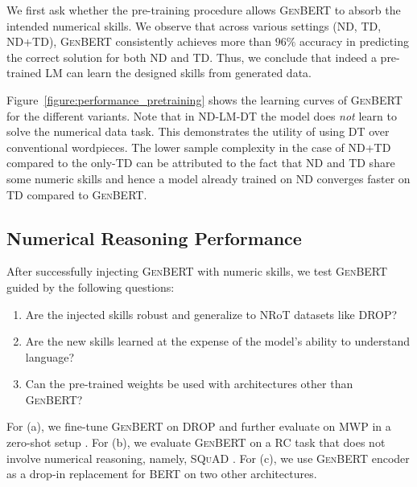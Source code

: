 \documentclass[11pt,a4paper]{article}
\newcommand\bert{\textsc{BERT}}
\newcommand\genbert{\textsc{GenBERT}}
\newcommand\drop{\textsc{DROP}}
\newcommand\squad{\textsc{SQuAD}}
\begin{document}
We first ask whether the pre-training procedure allows \genbert{} to absorb the intended numerical skills. We observe that across various settings (ND, TD, ND+TD), \genbert{} consistently achieves more than $96\%$ accuracy in predicting the correct solution for both ND and TD. Thus, we conclude that indeed a pre-trained LM can learn the designed skills from generated data.

Figure~\ref{figure:performance_pretraining} shows the learning curves of \genbert{} for the different variants. 
Note that in \textsc{ND-LM-DT} the model does \emph{not} learn to solve the numerical data task. This demonstrates the utility of using DT over conventional wordpieces. The lower sample complexity in the case of \textsc{ND+TD} compared to the only-\textsc{TD} can be attributed to the fact that ND and TD share some numeric skills and hence a model already trained on ND converges faster on TD compared to \genbert{}.















\subsection{Numerical Reasoning Performance}
\label{section:numerical_reasoning_performance}

After successfully injecting \genbert{} with numeric skills, we test \genbert{} guided by the following questions:
\begin{enumerate}[label=(\alph*),leftmargin=*,topsep=0pt,itemsep=0pt,parsep=0pt]
    \item Are the injected skills robust and generalize to NRoT datasets like \drop?
    \item Are the new skills learned at the expense of the model's ability to understand language?
\item Can the pre-trained weights be used with architectures other than \genbert{}?
\end{enumerate}
For (a), we fine-tune \genbert{} on \drop{} and further evaluate on MWP in a zero-shot setup .
For (b), we evaluate \genbert{} on a RC task that does not involve numerical reasoning, namely, \squad{} \cite{rajpurkar2016squad}. For (c), we use \genbert{} encoder as a drop-in replacement for \bert{} on two other architectures.
\end{document}
